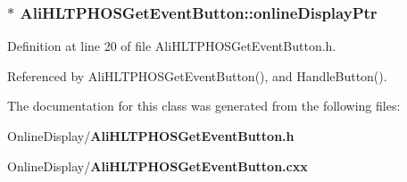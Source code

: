 \subsubsection{$\ast$ {\bf Ali\-HLTPHOSGet\-Event\-Button::online\-Display\-Ptr}\hspace{0.3cm}{\tt  [private]}}\label{classAliHLTPHOSGetEventButton_r0}




Definition at line 20 of file Ali\-HLTPHOSGet\-Event\-Button.h.

Referenced by Ali\-HLTPHOSGet\-Event\-Button(), and Handle\-Button().

The documentation for this class was generated from the following files:\begin{CompactItemize}
\item 
Online\-Display/{\bf Ali\-HLTPHOSGet\-Event\-Button.h}\item 
Online\-Display/{\bf Ali\-HLTPHOSGet\-Event\-Button.cxx}\end{CompactItemize}
